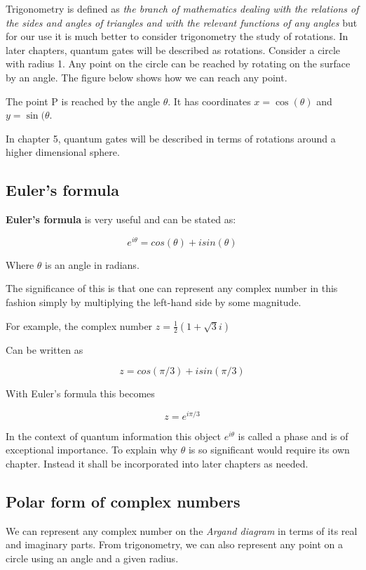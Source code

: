 \documentclass{book}
\begin{document}
Trigonometry is defined as \textit{the branch of mathematics dealing with the relations of the sides and angles of triangles and with the relevant functions of any angles} but for our use it is much better to consider trigonometry the study of rotations. In later chapters, quantum gates will be described as rotations. Consider a circle with radius 1. Any point on the circle can be reached by rotating on the surface by an angle. The figure below shows how we can reach any point.


The point P is reached by the angle $ \theta $. It has coordinates $ x = \cos(\theta) $ and $ y = \sin(\theta $.

In chapter 5, quantum gates will be described in terms of rotations around a higher dimensional sphere. 

\subsection{ Euler's formula}

\textbf{Euler's formula} is very useful and can be stated as:

$$ e^{i \theta} = cos(\theta) + i sin(\theta) $$

Where $\theta$ is an angle in radians. 

The significance of this is that one can represent any complex number in this fashion simply by multiplying the left-hand side by some magnitude. 

For example, the complex number $ z = \frac{1}{2}( 1 + \sqrt{3}i)$ 

Can be written as 

$$ z = cos(\pi/3) + i sin(\pi/3) $$

With Euler's formula this becomes 

$$ z = e^{i \pi/3} $$

In the context of quantum information this object $ e^{i\theta}$ is called a phase and is of exceptional importance. To explain why $\theta$ is so significant would require its own chapter. Instead it shall be incorporated into later chapters as needed.


\subsection{ Polar form of complex numbers}

We can represent any complex number on the \textit{Argand diagram} in terms of its real and imaginary parts. From trigonometry, we can also represent any point on a circle using an angle and a given radius. 
\end{document}
